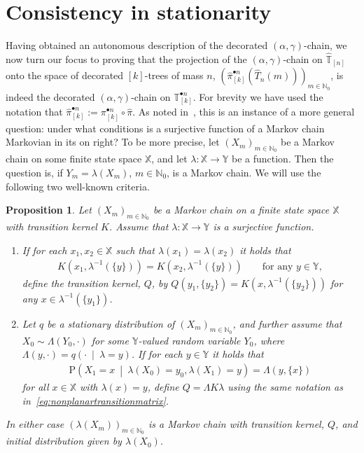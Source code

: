 \documentclass[a4paper, final]{amsart}
\theoremstyle{plain}
\newtheorem{prop}[thm]{Proposition}
\theoremstyle{definition}
\newcommand{\That}[1][T]{\widehat{#1}}
\newcommand{\Thatspace}[1][\T]{\widehat{\boldsymbol{#1}}} %
\newcommand{\T}{\mathbb{T}}
\newcommand{\XX}{\mathbb{X}}
\newcommand{\YY}{\mathbb{Y}}
\renewcommand{\P}{\mathrm{P}}
\newcommand{\N}{\mathbb{N}}
\begin{document}
\section{Consistency in stationarity}
%
Having obtained an autonomous description of the decorated $(\alpha, \gamma)$-chain, we now turn our focus to proving that the projection of the $(\alpha, \gamma)$-chain on $\Thatspace_{[n]}$ onto the space of decorated $[k]$-trees of mass $n$, ${\left( \hat{\pi}_{[k]}^{\bullet n} \left( \That_n (m) \right) \right)}_{m \in \N_0}$, is indeed the decorated $(\alpha, \gamma)$-chain on $\T_{[k]}^{\bullet n}$.
For brevity we have used the notation that $\hat{\pi}_{[k]}^{\bullet n} := \pi_{[k]}^{\bullet n} \circ \hat{\pi}$.
As noted in~\cite{RefWorks:doc:5b4cbc93e4b07f5746e47014}, this is an instance of a more general question:
under what conditions is a surjective function of a Markov chain Markovian in its on right?
To be more precise, let ${\left( X_m \right)}_{m \in \N_0}$ be a Markov chain on some finite state space $\XX$, and let $\lambda \colon \XX \to \YY$ be a function.
Then the question is, if $Y_m = \lambda \left( X_m \right)$, $m \in \N_0$, is a Markov chain.
We will use the following two well-known criteria.
%
\begin{prop}%
  \label{prop:intertwining_kemenysnell}
  Let ${\left( X_m \right)}_{m \in \N_0}$ be a Markov chain on a finite state space $\XX$ with transition kernel $K$.
  Assume that $\lambda \colon \XX \to \YY$ is a surjective function.
  \begin{enumerate}
    \item\label{prop:kemenysnell_criterion} If for each $x_1, x_2 \in \XX$ such that $\lambda(x_1) = \lambda(x_2)$ it holds that
      \begin{align}
        K \left( x_1, \lambda^{-1}(\{y\}) \right)
        =
        K \left( x_2, \lambda^{-1}(\{y\}) \right)
        \qquad \text{for any $y \in \YY$},
        \label{eq:kemeneysnell}
      \end{align}
      define the transition kernel, $Q$, by $Q(y_1, \{ y_2 \}) = K(x, \lambda^{-1}(\{y_2\}))$ for any $x \in \lambda^{-1}(\{y_1\})$.
    \item\label{prop:intertwining_criterion} Let $q$ be a stationary distribution of ${\left( X_m \right)}_{m \in \N_0}$, and further assume that $X_0 \sim \Lambda(Y_0, \cdot)$ for some $\YY$-valued random variable $Y_0$, where $\Lambda(y, \cdot) = q \left( \cdot \ \middle \vert \ \lambda = y \right)$.
      If for each $y \in \YY$ it holds that
      \begin{align}
        \P \left( X_1 = x \ \middle \vert \ \lambda(X_0) = y_0, \lambda(X_1) = y \right)
        =
        \Lambda \left( y, \{x\} \right)
        \label{eq:intertwiningcriterion}
      \end{align}
      for all $x \in \XX$ with $\lambda(x) = y$, define $Q = \Lambda K \lambda$ using the same notation as in~\eqref{eq:nonplanartransitionmatrix}.
  \end{enumerate}
  In either case ${\left( \lambda(X_m) \right)}_{m \in \N_0}$ is a Markov chain with transition kernel, $Q$, and initial distribution given by $\lambda(X_0)$.
\end{prop}
\end{document}
